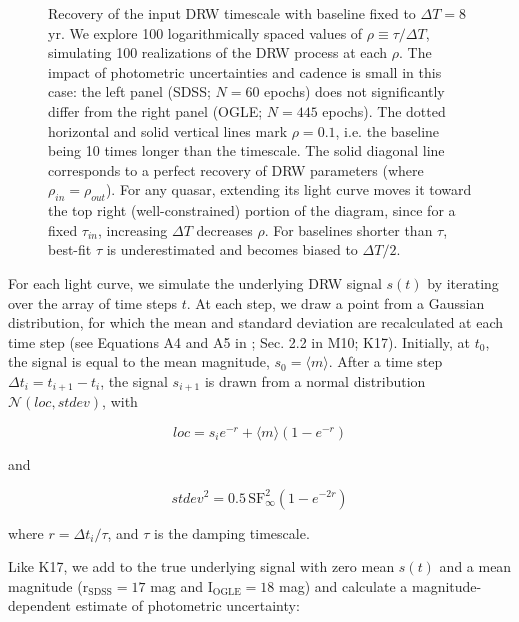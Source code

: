 \documentclass[twocolumn]{aastex62}
\begin{document}
\begin{figure*}
	\caption{Recovery of the input DRW timescale with baseline fixed to $\Delta T = 8$ yr. We explore 100 logarithmically spaced values of $\rho \equiv \tau / \Delta T$, simulating 100 realizations of the DRW process at each $\rho$. The impact of photometric uncertainties and cadence is small in this case: the left panel (SDSS; $N=60$ epochs) does not significantly differ from the right panel (OGLE; $N=445$ epochs). The dotted horizontal and solid vertical lines mark $\rho = 0.1$, i.e. the baseline being 10 times longer than the timescale. The solid diagonal line corresponds to a perfect recovery of DRW parameters (where $\rho_{in} =\rho_{out} $). For any quasar, extending its light curve  moves it toward the top right (well-constrained) portion of the diagram, since for a fixed $\tau_{in}$, increasing $\Delta T$ decreases $\rho$. For baselines shorter than $\tau$, best-fit $\tau$ is underestimated and becomes biased to $\Delta T /2 $. } 
	\label{fig:rho_space}
\end{figure*}


For each light curve, we simulate the underlying DRW signal $s(t)$ by iterating over the array of time steps $t$.  At each step, we draw a point from a Gaussian distribution, for which the mean and standard deviation are recalculated at each time step (see Equations A4 and A5 in \citealt{kelly2009}; Sec. 2.2 in M10; K17). Initially, at $t_{0}$, the signal is equal to the mean magnitude, $s_{0} = \langle m \rangle$. After a time step $\Delta t_{i} = t_{i+1} - t_{i}$, the signal $s_{i+1}$ is drawn from  a normal distribution $\mathcal{N}(loc, stdev)$, with 

\begin{equation}
loc = s_{i} e ^ { - r  }  + \langle m \rangle \left( 1 - e ^{ - r }\right)
\end{equation}

and 

\begin{equation}
stdev^{2} =  0.5  \, \mathrm{SF}_{\infty}^{2} \left( 1 - e ^{  - 2 r  }  \right)
\end{equation}

where  $r = \Delta t_{i} / \tau$, and $\tau$ is the damping timescale.


Like K17, we add to the true underlying signal with zero mean $s(t)$ and a mean magnitude  ($\mathrm{r_{SDSS}}=17$ mag and $\mathrm{I_{OGLE}}=18$ mag) and calculate a magnitude-dependent estimate of photometric uncertainty:
\end{document}
